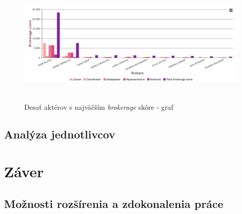 \documentclass[slovak,master,public,dept460,male,cpdeclaration,oneside]{diploma}
\begin{document}
\begin{figure}[H]
\centering
\includegraphics[width=15cm, height=6cm]{figures/team_brokerage_graph}
\caption{Desať aktérov s najväčším \textit{brokerage} skóre - graf}
\label{team_brokerage_graph}
\end{figure}

\subsection{Analýza jednotlivcov}



\section{Záver}



\subsection{Možnosti rozšírenia a zdokonalenia práce}



\newpage


 

\end{document}
